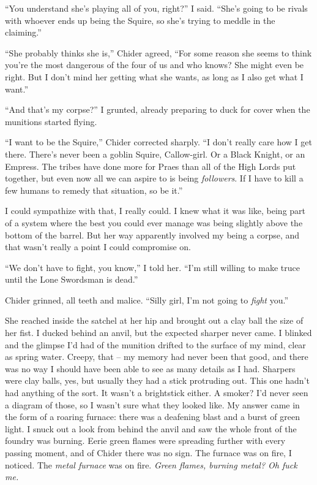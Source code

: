 \documentclass[12pt, openany]{book}
\begin{document}
“You understand she’s playing all of you, right?” I said. “She’s going to be rivals with whoever ends up being the Squire, so she’s trying to meddle in the claiming.”

“She probably thinks she is,” Chider agreed, “For some reason she seems to think you’re the most dangerous of the four of us and who knows? She might even be right. But I don’t mind her getting what she wants, as long as I also get what I want.”

“And that’s my corpse?” I grunted, already preparing to duck for cover when the munitions started flying.

“I want to be the Squire,” Chider corrected sharply. “I don’t really care how I get there. There’s never been a goblin Squire, Callow-girl. Or a Black Knight, or an Empress. The tribes have done more for Praes than all of the High Lords put together, but even now all we can aspire to is being \textit{followers}. If I have to kill a few humans to remedy that situation, so be it.”

I could sympathize with that, I really could. I knew what it was like, being part of a system where the best you could ever manage was being slightly above the bottom of the barrel. But her way apparently involved my being a corpse, and that wasn’t really a point I could compromise on.

“We don’t have to fight, you know,” I told her. “I’m still willing to make truce until the Lone Swordsman is dead.”

Chider grinned, all teeth and malice. “Silly girl, I’m not going to \textit{fight} you.”

She reached inside the satchel at her hip and brought out a clay ball the size of her fist. I ducked behind an anvil, but the expected sharper never came. I blinked and the glimpse I’d had of the munition drifted to the surface of my mind, clear as spring water. Creepy, that – my memory had never been that good, and there was no way I should have been able to see as many details as I had. Sharpers were clay balls, yes, but usually they had a stick protruding out. This one hadn’t had anything of the sort. It wasn’t a brightstick either. A smoker? I’d never seen a diagram of those, so I wasn’t sure what they looked like. My answer came in the form of a roaring furnace: there was a deafening blast and a burst of green light. I snuck out a look from behind the anvil and saw the whole front of the foundry was burning. Eerie green flames were spreading further with every passing moment, and of Chider there was no sign. The furnace was on fire, I noticed. The \textit{metal furnace} was on fire. \textit{Green flames, burning metal? Oh fuck me.}
\end{document}

